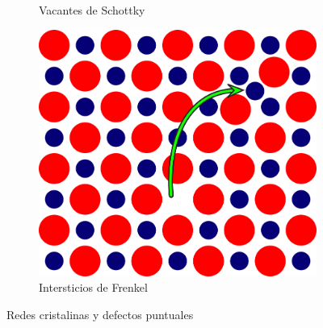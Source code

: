 \documentclass[a4paper,11pt]{article}
\begin{document}
\begin{figure}[b]
\begin{subfigure}[b]{0.3\textwidth}
        \caption{Vacantes de Schottky}
        \label{fig:schottky}
    \end{subfigure}
    \begin{subfigure}[b]{0.27\textwidth}
        \includegraphics[width=\textwidth]{figs/frenkel.png}
        \caption{Intersticios de Frenkel}
        \label{fig:frenkel}
    \end{subfigure}
    \caption{Redes cristalinas y defectos puntuales}
\end{figure}
\end{document}
